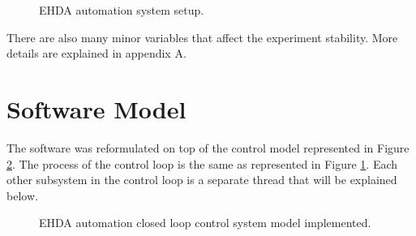 \begin{figure}[H]
  \centering
  \caption{EHDA automation system setup.}
  \label{fig:setup}
\end{figure}

There are also many minor variables that affect the experiment stability. More details are explained in appendix A.


\section{Software Model}
\label{sec:control_model}

The software was reformulated on top of the control model represented in Figure \ref{fig:control_model_fig}. The process of the control loop is the same as represented in Figure \ref{fig:setup}. 
Each other subsystem in the control loop is a separate thread that will be explained below.

\begin{figure}[H]
  \centering
  \caption{EHDA automation closed loop control system model implemented.}
  \label{fig:control_model_fig}
\end{figure}

